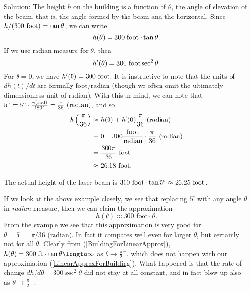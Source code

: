 \underline{Solution}: The height $h$ on the building is a 
function of $\theta$, the angle of elevation of the beam,
that is, the angle formed by the beam and the horizontal.
Since $h/(300 \text{ \rm foot})=\tan\theta$, we can write
\begin{equation}h(\theta)=300\text{ \rm foot} \cdot \tan\theta.
\label{BuildingForLinearApprox}\end{equation}
If we use radian measure for $\theta$, then
 $$h'(\theta)=300\text{ \rm foot}\sec^2\theta.$$
For $\theta=0$, we have $h'(0)=300\text{ \rm foot}$.
It is instructive to note that the units of
$dh(t)/dt$ are formally foot/radian (though we often
omit the ultimately dimensionless unit of radian).
With this in mind, we can note that $5^\circ
     =5^\circ\cdot\frac{\pi \text{\rm (rad)}}{180^\circ}=\frac{\pi}{36}
      \text{ \rm(radian)}$,
and so 
 \begin{align*}h\left(\frac{\pi}{36}\right)&\approx
  h(0)+h'(0)\frac{\pi}{36}\text{ \rm(radian)}\\
  &=0+300\frac{\text{\rm foot}}{\text{\rm radian}}\cdot
  \frac{\pi}{36}\text{ \rm (radian)}\\
  &=\frac{300\pi}{36}\text{ \rm foot}\\
  &\approx 26.18\text{  \rm foot}.\end{align*}

The actual height of the laser beam is $300\text{ \rm foot}\cdot\tan5^\circ
  \approx 26.25\text{ \rm foot}$.
\eex

If we look at the above example closely, we see that replacing
$5^\circ$ with any angle $\theta$ in {\it radian} measure, then
we can claim the approximation
\begin{equation}
h(\theta)\approx 300\text{ foot}\cdot\theta.\label{LinearApproxForBuilding}
\end{equation}
From the example we see that this approximation is very good for
$\theta=5^\circ=\pi/36\text{ (radian)}$.  In fact it compares well
even for larger $\theta$, but certainly not for all $\theta$.
Clearly from (\ref{BuildingForLinearApprox}),
$h(\theta)=300\text{ ft}\cdot\tan\theta
\longto\infty$ as $\theta\to{\frac{\pi}{2}}^-$,
which does not happen with our approximation (\ref{LinearApproxForBuilding}).
What happened is that the rate of change $dh/d\theta=300\sec^2\theta$
did not stay at all constant, and in fact blew up also as
$\theta\to{\frac{\pi}2}^-$.

